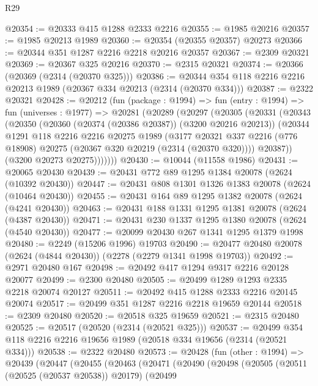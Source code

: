 \begin{lexlean}{R29}
\begin{coremodule}
@20354 := @20333 @415 @1288 @2333 @2216
@20355 := @1985 @20216
@20357 := @1985 @20213 @1989
@20360 := @20354 (@20355 @20357) @20273
@20366 := @20344 @351 @1287 @2216 @2218 @20216 @20357
@20367 := @2309 @20321
@20369 := @20367 @325 @20216
@20370 := @2315 @20321
@20374 := @20366 (@20369 (@2314 (@20370 @325)))
@20386 := @20344 @354 @118 @2216 @2216 @20213 @1989 (@20367 @334 @20213 (@2314 (@20370 @334)))
@20387 := @2322 @20321
@20428 := @20212
    (fun (package : @1994) =>
    fun (entry : @1994) =>
    fun (universes : @1977) =>
    @20281
      (@20289
        (@20297
          (@20305
            (@20331
              (@20343
                (@20350
                  (@20360 (@20374 (@20386 @20387)) (@3200 @20216 @20213))
                  (@20344
                    @1291
                    @118
                    @2216
                    @2216
                    @20275
                    @1989
                    (@3177
                      @20321
                      @337
                      @2216
                      (@776 @18908)
                      @20275
                      (@20367 @320 @20219 (@2314 (@20370 @320))))
                    @20387))
                (@3200 @20273 @20275)))))))
@20430 := @10044 (@11558 @1986)
@20431 := @20065 @20430
@20439 := @20431 @772 @89 @1295 @1384 @20078 (@2624 (@10392 @20430))
@20447 := @20431 @808 @1301 @1326 @1383 @20078 (@2624 (@10464 @20430))
@20455 := @20431 @164 @89 @1295 @1382 @20078 (@2624 (@4241 @20430))
@20463 := @20431 @188 @1331 @1295 @1381 @20078 (@2624 (@4387 @20430))
@20471 := @20431 @230 @1337 @1295 @1380 @20078 (@2624 (@4540 @20430))
@20477 := @20099 @20430 @267 @1341 @1295 @1379 @1998
@20480 := @2249 (@15206 @1996) @19703
@20490 := @20477 @20480 @20078 (@2624 (@4844 @20430)) (@2278 (@2279 @1341 @1998 @19703))
@20492 := @2971 @20480 @167
@20498 := @20492 @417 @1294 @9317 @2216 @20128 @20077
@20499 := @2300 @20480
@20505 := @20499 @1289 @1293 @2335 @2218 @20074 @20127
@20511 := @20492 @415 @1288 @2333 @2216 @20145 @20074
@20517 := @20499 @351 @1287 @2216 @2218 @19659 @20144
@20518 := @2309 @20480
@20520 := @20518 @325 @19659
@20521 := @2315 @20480
@20525 := @20517 (@20520 (@2314 (@20521 @325)))
@20537 := @20499 @354 @118 @2216 @2216 @19656 @1989 (@20518 @334 @19656 (@2314 (@20521 @334)))
@20538 := @2322 @20480
@20573 := @20428
    (fun (other : @1994) =>
    @20439
      (@20447
        (@20455
          (@20463
            (@20471
              (@20490
                (@20498
                  (@20505
                    (@20511 (@20525 (@20537 @20538)) @20179)
                    (@20499

\end{coremodule}
\end{lexlean}
